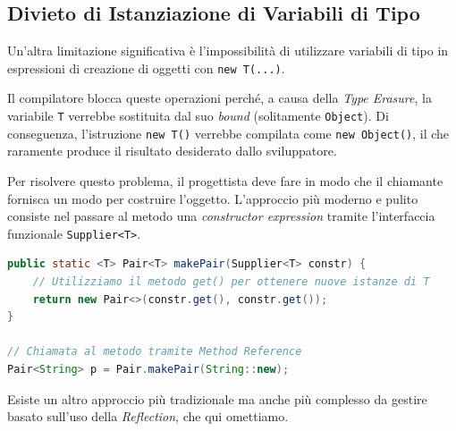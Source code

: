 \subsection{Divieto di Istanziazione di Variabili di Tipo}

Un'altra limitazione significativa è l'impossibilità di utilizzare variabili di tipo in espressioni di creazione di oggetti con \texttt{new T(...)}.

Il compilatore blocca queste operazioni perché, a causa della \textit{Type Erasure}, la variabile \texttt{T} verrebbe sostituita dal suo \textit{bound} (solitamente \texttt{Object}). Di conseguenza, l'istruzione \texttt{new T()} verrebbe compilata come \texttt{new Object()}, il che raramente produce il risultato desiderato dallo sviluppatore.

Per risolvere questo problema, il progettista deve fare in modo che il chiamante fornisca un modo per costruire l'oggetto. L'approccio più moderno e pulito consiste nel passare al metodo una \textit{constructor expression} tramite l'interfaccia funzionale \texttt{Supplier<T>}.

\begin{lstlisting}[language=Java, caption={Istanziazione tramite Supplier}]
public static <T> Pair<T> makePair(Supplier<T> constr) {
    // Utilizziamo il metodo get() per ottenere nuove istanze di T
    return new Pair<>(constr.get(), constr.get());
}

// Chiamata al metodo tramite Method Reference
Pair<String> p = Pair.makePair(String::new);
\end{lstlisting}

\begin{observation}
    Esiste un altro approccio più tradizionale ma anche più complesso da gestire basato sull'uso della \textit{Reflection}, che qui omettiamo.
\end{observation}















